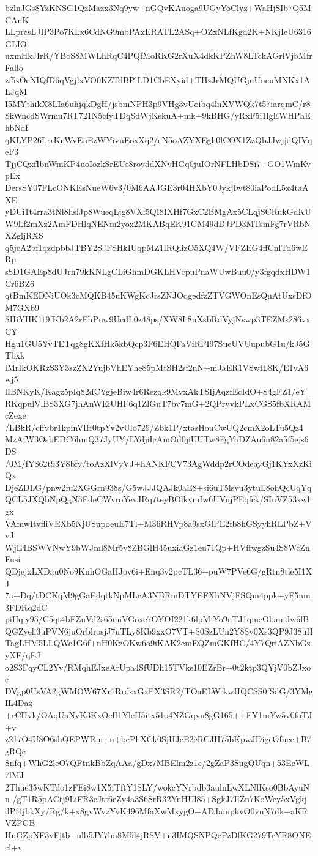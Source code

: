 bzlnJGs8YzKNSG1QzMazx3Nq9yw+nGQvKAuoga9UGyYoClyz+WaHjSIb7Q5MCAnK
LLprcsLJIP3Po7KLx6CdNG9mbPAxERATL2ASq+OZxNLfKgd2K+NKjIeU6316GLIO
uxmHkJIrR/YBoS8MWLhRqC4PQfMoRKG2rXuX4dkKPZhW8LTckAGrlVjbMfrFallo
zf5zOeNIQfD6qVgjlxVO0KZTdBPlLD1CbEXyid+THzJrMQUGjnUucuMNKx1ALJqM
I5MYthikX8LIa6uhjqkDgH/jsbmNPH3p9VHg3vUoibq4lnXVWQk7t57iarqmC/r8
SkWncdSWrmu7RT721N5cfyTDqSdWjKskuA+mk+9kBHG/yRxF5i1lgEWHPhEhbNdf
qKLYP26LrrKnWvEnEzWYivuEoxXq2/eN5oAZYXEgh0lCOX1ZzQbJJwjjdQIVqeF3
TjjCQxfIbnWmKP4uoIozkSrEUs8royddXNvHGq0juIOrNFLHbDSi7+GO1WmKvpEx
DersSY07FLcONKEsNueW6v3/0M6AAJGE3r04HXbY0JykjIwt80iaPodL5x4taAXE
yDUi1t4rra3tNl8hslJp8WueqLjg8VXf5QI8IXHf7GxC2BMgAx5CLqjSCRukGdKU
W9Lf2mXz2AmFDHlqNENm2yox2MKABqEK91GM49dDJPD3MTsmFg7rVRbNXZgljRXS
q5jcA2bf1qzdpbbJTBY2SJFSHkIUqpMZ1lRQiizO5XQ4W/VFZEG4ffCnlTd6wERp
sSD1GAEp8dUJrh79kKNLgCLiGhmDGKLHVcpuPnaWUwBuu0/y3fgqdxHDW1Cr6BZ6
qtBmKEDNiUOk3cMQKB45uKWgKcJrsZNJOqgedfzZTVGWOnEsQuAtUxsDfOM7GXb9
SHiYHK1t9fKb2A2rFhPnw9UcdL0z48ps/XW8L8uXsbRdVyjNswp3TEZMs286vxCY
Hgu1GU5YvTETqg8gKXfHk5kbQcp3F6EHQFaViRPI97SueUVUupubG1u/kJ5GTbxk
lMrIkOKRzS3Y3szZX2YujbVhEYhe85pMtSH2sf2nN+mJaER1VSwfL8K/E1vA6wj5
lIBNKyK/Kagz5pIq82dCYgjeBiw4r6Rezqk9MvxAkTSIjAqzfEcIdO+S4gFZ1/eY
RKqpulVlBS3XG7jhAnWEiUHF6q1ZlGuT7bv7mG+2QPryvkPLxCGS5fbXRAMcZexe
/LBkR/cffvbr1kpinVlH0tpYv2vUlo729/Zbk1P/xtasHouCwUQ2cmX2oLTu5Qz4
MzAfW3OsbEDC6hmQ37JyUY/LYdjiIcAmOd0jiUUTw8FgYoDZAu6n82a5f5ejs6DS
/0M/fY862t93Y8bfy/toAzXlVyVJ+hANKFCV73AgWddp2rCOdeayGj1KYxXzKiQx
DjeZDLG/pnw2fu2XGGrn938s/G5wJJJQAJk0aE8+si6uT5lsvu3ytuL8ohQcUqYq
QCL5JXQbNpQgN5EdeCWvroYevJRq7teyBOlkvmIw6UVujPEqfck/SIuVZ53xwlgx
VAmwItvfliVEXb5NjUSupoeuE7Tl+M36RHVp8a9sxGlPE2fb8hGSyyhRLPbZ+VvJ
WjE4BSWVNwY9bWJml8Mr5v8ZBGlH45uxiaGz1eu71Qp+HVffwgzSu4S8WcZnFusi
QDjejxLXDau0No9KnhOGaHJov6i+Enq3v2pcTL36+puW7PVe6G/gRtn8tle5I1XJ
7a+Dq/tDCKqM9gGaEdqtkNpMLcA3NBRmDTYEFXhNVjFSQm4ppk+yF5nm3FDRq2dC
piHqiy95/C5qt4bFZuVd2s65miVGoxe7OYOI221k6lpMiYo9nTJ1qmeObamdw6lB
QGZyeli3uPVN6juOrblrosjJ7uTLy8Kb9xxO7VT+S0SzLUn2Y8Sy0Xs3QP9J38uH
TagLHM5LLQWc1G6f+nH0KzOKw6o9iKAK2cmEQZmGKfHC/4Y7QriAZNbGzyXF/qEJ
o2S3FqyCL2Yv/RMqhEJxeArUpa4SfUDh15TVke10EZrBr+0t2ktp3QYjV0bZJxoc
DVgp0UsVA2gWMOW67Xr1RrdsxGxFX3SR2/TOaELWrkwHQCSS0fSdG/3YMgIL4Daz
+rCHvk/OAqUaNvK3KxOclI1YleH5itx51o4NZGqvu8gG165++FY1mYw5v0foTJ+v
z217O4U8O6shQEPWRm+u+bePhXCk0SjHJcE2eRCJH75bKpwJDigeOfuce+B7gRQc
Snfq+WhG2leO7QFtnkBbZqAAa/gDx7MBElm2z1e/2gZaP3SugQUqn+53EcWL7lMJ
2Thue35wKTdo1zFEi8w1X5fTftY1SLY/wokcYNrbdb3aulnLwXLNlKso0BbAyuNn
/gT1R5pACtj9LiFR3eJtt6cZy4a3S6SrR32YuHUl85+SgkJ7IlZn7KoWey5xVgkj
dPf4jbkXy/Rg/k+x8gvWvzYvK496MfaXwMxygO+ADJampkvO0vnN7dk+aKRVZPGB
HuGZpNF3vFjtb+ulb5JY7lm8M5l4jRSV+n3IMQSNPQePzDfKG279TrYR8ONEcl+v
